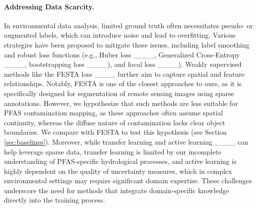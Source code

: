 \paragraph{Addressing Data Scarcity.}
In environmental data analysis, limited ground truth often necessitates pseudo- or augmented labels, which can introduce noise and lead to overfitting. Various strategies have been proposed to mitigate these issues, including label smoothing and robust loss functions (e.g., Huber loss ____, Generalized Cross-Entropy ____, bootstrapping loss ____), and focal loss ____). Weakly supervised methods like the FESTA loss ____ further aim to capture spatial and feature relationships. %
Notably, FESTA is one of the closest approaches to ours, as it is specifically designed for segmentation of remote sensing images using sparse annotations. However, we hypothesize that such methods are less suitable for PFAS contamination mapping, as these approaches often assume spatial continuity, whereas the diffuse nature of contamination lacks clear object boundaries. We compare with FESTA to test this hypothesis (see Section \ref{sec:baselines}). 
Moreover, while transfer learning and active learning ____ can help leverage sparse data, transfer learning is limited by our incomplete understanding of PFAS-specific hydrological processes, and active learning is highly dependent on the quality of uncertainty measures, which in complex environmental settings may require significant domain expertise. These challenges underscore the need for methods that integrate domain-specific knowledge directly into the training process.
